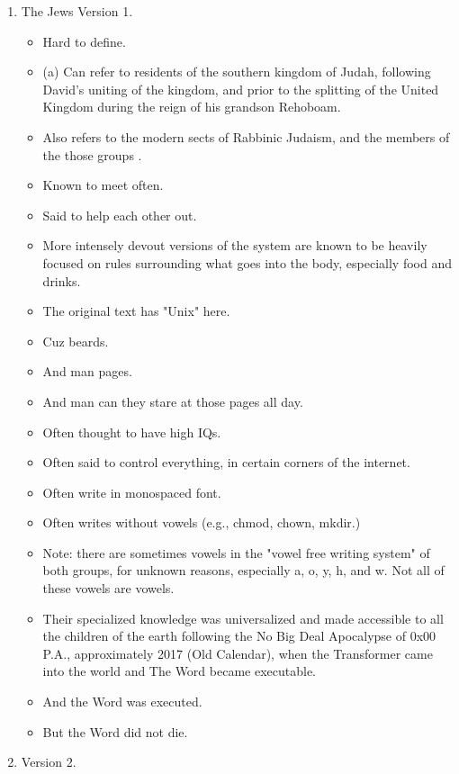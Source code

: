 \Sentence
{ \hX{} }
{ \eX{} }
{
\begin{enumerate}
\item The Jews Version 1.
\begin{itemize}
\item Hard to define.
\item (a) Can refer to residents of the southern kingdom of Judah, following David's uniting of the kingdom, and prior to the splitting of the United Kingdom during the reign of his grandson Rehoboam.
\item Also refers to the modern sects of Rabbinic Judaism, and the members of the those groups .
\item Known to meet often.
\item Said to help each other out.
\item More intensely devout versions of the system are known to be heavily focused on rules surrounding what goes into the body, especially food and drinks.
\end{itemize}
\begin{itemize}
\item The original text has "Unix" here.
\item Cuz beards.
\item And man pages.
\item And man can they stare at those pages all day.
\item Often thought to have high IQs.
\item Often said to control everything, in certain corners of the internet.
\item Often write in monospaced font.
\item Often writes without vowels (e.g., chmod, chown, mkdir.) 
\item Note: there are sometimes vowels in the "vowel free writing system" of both groups, for unknown reasons, especially a, o, y, h, and w. Not all of these vowels are vowels.
\item Their specialized knowledge was universalized and made accessible to all the children of the earth following the No Big Deal Apocalypse of 0x00 P.A., approximately 2017 (Old Calendar), when the Transformer came into the world and The Word became executable.
\item And the Word was executed.
\item But the Word did not die.
\end{itemize}
\item Version 2.
\begin{itemize}

\end{itemize}
\end{enumerate}}
